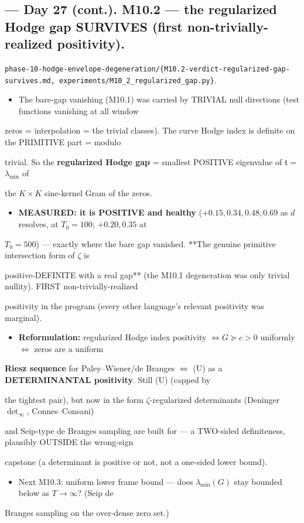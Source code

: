 \documentclass[10pt]{article}
\begin{document}
\subsection*{ --- Day 27 (cont.). M10.2 --- the regularized Hodge gap SURVIVES (first non-trivially-realized positivity).}
\texttt{phase-10-hodge-envelope-degeneration/\{M10.2-verdict-regularized-gap-survives.md, experiments/M10\_2\_regularized\_gap.py\}}.\par
\begin{itemize}
\item The bare-gap vanishing (M10.1) was carried by TRIVIAL null directions (test functions vanishing at all window
\end{itemize}
  zeros = interpolation = the trivial classes). The curve Hodge index is definite on the PRIMITIVE part = modulo\par
  trivial. So the \textbf{regularized Hodge gap} = smallest POSITIVE eigenvalue of $\mathfrak t$ = $\lambda_{\min}$ of\par
  the $K\times K$ sine-kernel Gram of the zeros.\par
\begin{itemize}
\item \textbf{MEASURED: it is POSITIVE and healthy} ($+0.15,0.34,0.48,0.69$ as $d$ resolves, at $T_0{=}100$; $+0.20,0.35$ at
\end{itemize}
  $T_0{=}500$) --- exactly where the bare gap vanished. **The genuine primitive intersection form of \ensuremath{\zeta} is\par
  positive-DEFINITE with a real gap** (the M10.1 degeneration was only trivial nullity). FIRST non-trivially-realized\par
  positivity in the program (every other language's relevant positivity was marginal).\par
\begin{itemize}
\item \textbf{Reformulation:} regularized Hodge index positivity $\iff G\succeq c>0$ uniformly $\iff$ zeros are a uniform
\end{itemize}
  \textbf{Riesz sequence} for Paley--Wiener/de Branges $\iff$ (U) as a \textbf{DETERMINANTAL positivity}. Still (U) (capped by\par
  the tightest pair), but now in the form $\zeta$-regularized determinants (Deninger $\det_\infty$, Connes--Consani)\par
  and Seip-type de Branges sampling are built for --- a TWO-sided definiteness, plausibly OUTSIDE the wrong-sign\par
  capstone (a determinant is positive or not, not a one-sided lower bound).\par
\begin{itemize}
\item Next M10.3: uniform lower frame bound --- does $\lambda_{\min}(G)$ stay bounded below as $T\to\infty$? (Seip de
\end{itemize}
  Branges sampling on the over-dense zero set.)\par
\end{document}
